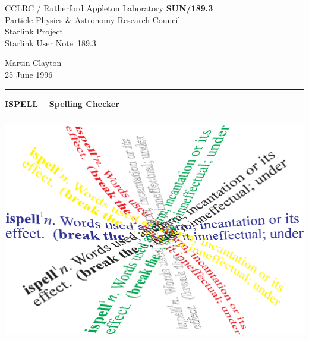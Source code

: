 \documentclass[twoside,11pt]{article}
\newcommand{\stardoccategory}  {Starlink User Note}
\newcommand{\stardocinitials}  {SUN}
\newcommand{\stardocnumber}    {189.3}
\newcommand{\stardocauthors}   {Martin Clayton}
\newcommand{\stardocdate}      {25 June 1996}
\newcommand{\stardoctitle}     {ISPELL \sunspec{--}{-} Spelling Checker}
\newcommand{\stardocversion}   {[software-version]}
\newcommand{\stardocmanual}    {[manual-type]}
\newcommand{\stardocname}{\stardocinitials /\stardocnumber}
\newenvironment{latexonly}{}{}
\newcommand{\sunspec}[2]{#1}
\newcommand{\sunspec}[2]{#2}
\begin{document}
\thispagestyle{empty}

\begin{latexonly}
   CCLRC / {\sc Rutherford Appleton Laboratory} \hfill {\bf \stardocname}\\
   {\large Particle Physics \& Astronomy Research Council}\\
   {\large Starlink Project\\}
   {\large \stardoccategory\ \stardocnumber}
   \begin{flushright}
   \stardocauthors\\
   \stardocdate
   \end{flushright}
   \vspace{-4mm}
   \rule{\textwidth}{0.5mm}
   \vspace{5mm}
   \begin{center}
   {\Huge\bf  \stardoctitle \\ [2.5ex]}
   \end{center}
   \vspace{5mm}

   \begin{center}
   \leavevmode\includegraphics[height=100mm]{sun189_cover}
   \end{center}

\end{latexonly}
\end{document}
